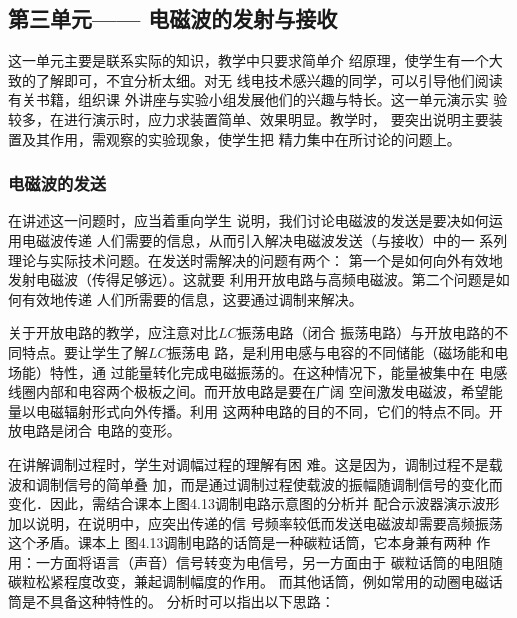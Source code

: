 \subsection{第三单元—— 电磁波的发射与接收}

这一单元主要是联系实际的知识，教学中只要求简单介
绍原理，使学生有一个大致的了解即可，不宜分析太细。对无
线电技术感兴趣的同学，可以引导他们阅读有关书籍，组织课
外讲座与实验小组发展他们的兴趣与特长。这一单元演示实
验较多，在进行演示时，应力求装置简单、效果明显。教学时，
要突出说明主要装置及其作用，需观察的实验现象，使学生把
精力集中在所讨论的问题上。

\subsubsection{电磁波的发送}

在讲述这一问题时，应当着重向学生
说明，我们讨论电磁波的发送是要决如何运用电磁波传递
人们需要的信息，从而引入解决电磁波发送（与接收）中的一
系列理论与实际技术问题。在发送时需解决的问题有两个：
第一个是如何向外有效地发射电磁波（传得足够远）。这就要
利用开放电路与高频电磁波。第二个问题是如何有效地传递
人们所需要的信息，这要通过调制来解决。

关于开放电路的教学，应注意对比$LC$振荡电路（闭合
振荡电路）与开放电路的不同特点。要让学生了解$LC$振荡电
路，是利用电感与电容的不同储能（磁场能和电场能）特性，通
过能量转化完成电磁振荡的。在这种情况下，能量被集中在
电感线圈内部和电容两个极板之间。而开放电路是要在广阔
空间激发电磁波，希望能量以电磁辐射形式向外传播。利用
这两种电路的目的不同，它们的特点不同。开放电路是闭合
电路的变形。

在讲解调制过程时，学生对调幅过程的理解有困
难。这是因为，调制过程不是载波和调制信号的简单叠
加，而是通过调制过程使载波的振幅随调制信号的变化而
变化．因此，需结合课本上图4.13调制电路示意图的分析并
配合示波器演示波形加以说明，在说明中，应突出传递的信
号频率较低而发送电磁波却需要高频振荡这个矛盾。课本上
图4.13调制电路的话筒是一种碳粒话筒，它本身兼有两种
作用：一方面将语言（声音）信号转变为电信号，另一方面由于
碳粒话筒的电阻随碳粒松紧程度改变，兼起调制幅度的作用。
而其他话筒，例如常用的动圈电磁话筒是不具备这种特性的。
分析时可以指出以下思路：
\begin{center}
\end{center}

